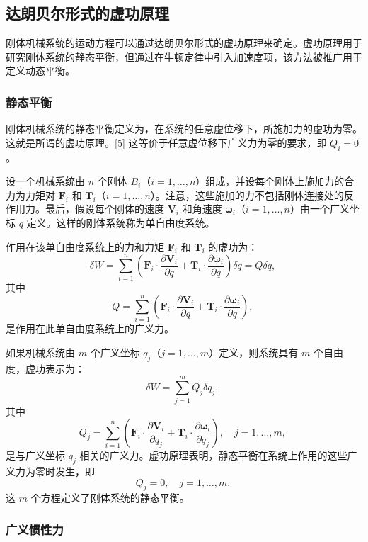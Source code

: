 \subsection{达朗贝尔形式的虚功原理}
刚体机械系统的运动方程可以通过达朗贝尔形式的虚功原理来确定。虚功原理用于研究刚体系统的静态平衡，但通过在牛顿定律中引入加速度项，该方法被推广用于定义动态平衡。
\subsubsection{静态平衡}
刚体机械系统的静态平衡定义为，在系统的任意虚位移下，所施加力的虚功为零。这就是所谓的虚功原理。[5] 这等价于任意虚位移下广义力为零的要求，即 \( Q_i = 0 \)。

设一个机械系统由 \( n \) 个刚体 \( B_i \)（\( i = 1, \dots, n \)）组成，并设每个刚体上施加力的合力为力矩对 \( \mathbf{F}_i \) 和 \( \mathbf{T}_i \)（\( i = 1, \dots, n \)）。注意，这些施加的力不包括刚体连接处的反作用力。最后，假设每个刚体的速度 \( \mathbf{V}_i \) 和角速度 \( \boldsymbol{\omega}_i \)（\( i = 1, \dots, n \)）由一个广义坐标 \( q \) 定义。这样的刚体系统称为单自由度系统。

作用在该单自由度系统上的力和力矩 \( \mathbf{F}_i \) 和 \( \mathbf{T}_i \) 的虚功为：
\[
\delta W = \sum_{i=1}^{n} \left( \mathbf{F}_i \cdot \frac{\partial \mathbf{V}_i}{\partial \dot{q}} + \mathbf{T}_i \cdot \frac{\partial \boldsymbol{\omega}_i}{\partial \dot{q}} \right) \delta q = Q \delta q,~
\]
其中
\[
Q = \sum_{i=1}^{n} \left( \mathbf{F}_i \cdot \frac{\partial \mathbf{V}_i}{\partial \dot{q}} + \mathbf{T}_i \cdot \frac{\partial \boldsymbol{\omega}_i}{\partial \dot{q}} \right),~
\]
是作用在此单自由度系统上的广义力。

如果机械系统由 \( m \) 个广义坐标 \( q_j \)（\( j = 1, \dots, m \)）定义，则系统具有 \( m \) 个自由度，虚功表示为：
\[
\delta W = \sum_{j=1}^{m} Q_j \delta q_j,~
\]
其中
\[
Q_j = \sum_{i=1}^{n} \left( \mathbf{F}_i \cdot \frac{\partial \mathbf{V}_i}{\partial \dot{q}_j} + \mathbf{T}_i \cdot \frac{\partial \boldsymbol{\omega}_i}{\partial \dot{q}_j} \right), \quad j=1, \dots, m,~
\]
是与广义坐标 \( q_j \) 相关的广义力。虚功原理表明，静态平衡在系统上作用的这些广义力为零时发生，即
\[
Q_j = 0, \quad j=1, \dots, m.~
\]
这 \( m \) 个方程定义了刚体系统的静态平衡。
\subsubsection{广义惯性力}

